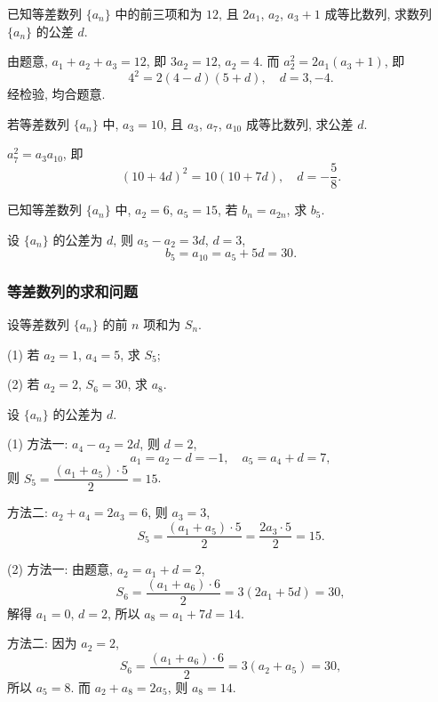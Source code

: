 \begin{example}
    已知等差数列 $\{a_n\}$ 中的前三项和为 $12$, 且 $2a_1$, $a_2$, $a_3+1$ 成等比数列, 求数列 $\{a_n\}$ 的公差 $d$.
\end{example}
\beginsolution
    由题意, $a_1+a_2+a_3= 12$, 即 $3a_2= 12$, $a_2= 4$. 而 $a_2^2= 2a_1(a_3+1)$, 即
    \[4^2= 2(4-d)(5+d),\quad d=3,-4.\]
    经检验, 均合题意.
\endsolution

\lianxi

\begin{exercise}
    若等差数列 $\{a_n\}$ 中, $a_3=10$, 且 $a_3$, $a_7$, $a_{10}$ 成等比数列, 求公差 $d$.
\end{exercise}
\beginsolution
    $a_7^2= a_3a_{10}$, 即
    \[(10+4d)^2= 10(10+7d),\quad d= -\frac58.\]
\endsolution

\begin{exercise}
    已知等差数列 $\{a_n\}$ 中, $a_2=6$, $a_5=15$, 若 $b_n=a_{2n}$, 求 $b_5$.
\end{exercise}
\beginsolution
    设 $\{a_n\}$ 的公差为 $d$, 则 $a_5-a_2= 3d$, $d=3$, 
    \[b_5= a_{10}= a_5+5d= 30.\]
\endsolution

\subsubsection{等差数列的求和问题}

\begin{example}
    设等差数列 $\{a_n\}$ 的前 $n$ 项和为 $S_n$.
    
    (1) 若 $a_2=1$, $a_4=5$, 求 $S_5$;

    (2) 若 $a_2=2$, $S_6=30$, 求 $a_8$.
\end{example}
\beginsolution
    设 $\{a_n\}$ 的公差为 $d$. 

    (1) 方法一: $a_4-a_2= 2d$, 则 $d=2$,
    \[a_1= a_2-d= -1,\quad a_5= a_4+d= 7,\]
    则 $S_5= \dfrac{(a_1+a_5)\cdot 5}2= 15$.

    方法二: $a_2+a_4= 2a_3= 6$, 则 $a_3= 3$, 
    \[S_5= \frac{(a_1+a_5)\cdot 5}2
        = \frac{2a_3\cdot 5}2= 15.\]
    
    (2) 方法一: 由题意, $a_2= a_1+d= 2$,
    \[S_6= \dfrac{(a_1+a_6)\cdot 6}2= 3(2a_1+5d)=30,\]
    解得 $a_1= 0$, $d= 2$, 所以 $a_8= a_1+ 7d= 14$.

    方法二: 因为 $a_2= 2$,
    \[S_6= \dfrac{(a_1+a_6)\cdot 6}2
        = 3(a_2+a_5)=30,\]
    所以 $a_5=8$. 而 $a_2+a_8= 2a_5$, 则 $a_8= 14$.
\endsolution

